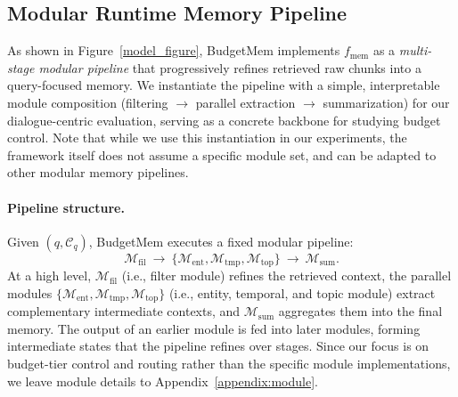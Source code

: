 \subsection{Modular Runtime Memory Pipeline}
\label{sec:framework}

As shown in Figure~\ref{model_figure}, BudgetMem implements $f_{\text{mem}}$ as a \emph{multi-stage modular pipeline} that progressively refines retrieved raw chunks into a query-focused memory. 
We instantiate the pipeline with a simple, interpretable module composition (filtering $\rightarrow$ parallel extraction $\rightarrow$ summarization) for our dialogue-centric evaluation, serving as a concrete backbone for studying budget control.
Note that while we use this instantiation in our experiments, the framework itself does not assume a specific module set, and can be adapted to other modular memory pipelines.






\paragraph{Pipeline structure.}
Given $(q, \mathcal{C}_q)$, BudgetMem executes a fixed modular pipeline:
\begin{equation}
\mathcal{M}_{\text{fil}}
~\rightarrow~
\{\mathcal{M}_{\text{ent}}, \mathcal{M}_{\text{tmp}}, \mathcal{M}_{\text{top}}\}
~\rightarrow~
\mathcal{M}_{\text{sum}}.
\end{equation}
At a high level, $\mathcal{M}_{\text{fil}}$ (i.e., filter module) refines the retrieved context, the parallel modules $\{\mathcal{M}_{\text{ent}}, \mathcal{M}_{\text{tmp}}, \mathcal{M}_{\text{top}}\}$ (i.e., entity, temporal, and topic module) extract complementary intermediate contexts, and $\mathcal{M}_{\text{sum}}$ aggregates them into the final memory.
The output of an earlier module is fed into later modules, forming intermediate states that the pipeline refines over stages.
Since our focus is on budget-tier control and routing rather than the specific module implementations, we leave module details to Appendix~\ref{appendix:module}.




